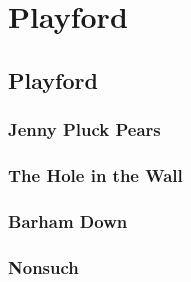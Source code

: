\documentclass[letterpaper,10pt,english]{sphinxmanual}
\begin{document}
\chapter{Playford}
\label{\detokenize{Playford/index:playford}}\label{\detokenize{Playford/index::doc}}

\section{Playford}
\label{\detokenize{Playford/Playford:playford}}\label{\detokenize{Playford/Playford::doc}}

\subsection{Jenny Pluck Pears}
\label{\detokenize{Playford/Playford:jenny-pluck-pears}}
\noindent{}


\subsection{The Hole in the Wall}
\label{\detokenize{Playford/Playford:the-hole-in-the-wall}}
\noindent{}


\subsection{Barham Down}
\label{\detokenize{Playford/Playford:barham-down}}
\noindent{}


\subsection{Nonsuch}
\label{\detokenize{Playford/Playford:nonsuch}}
\noindent{}



\renewcommand{\indexname}{Index}
\printindex
\end{document}
